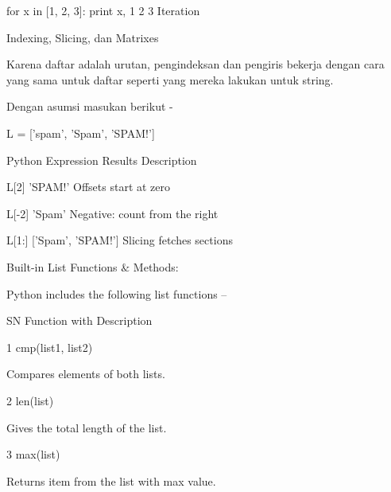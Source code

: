 for x in [1, 2, 3]: print x, \hspace*{0.5in} 1 2 3 \hspace*{0.5in} Iteration \par
\vspace{12pt}
Indexing, Slicing, dan Matrixes \par
Karena daftar adalah urutan, pengindeksan dan pengiris bekerja dengan cara yang sama untuk daftar seperti yang mereka lakukan untuk string. \par
Dengan asumsi masukan berikut - \par
L = ['spam', 'Spam', 'SPAM!'] \par
  \par
Python Expression \hspace*{0.5in} Results  \hspace*{0.5in} Description \par
L[2] \hspace*{0.5in} 'SPAM!' \hspace*{0.5in} Offsets start at zero \par
L[-2] \hspace*{0.5in} 'Spam' \hspace*{0.5in} Negative: count from the right \par
L[1:] \hspace*{0.5in} ['Spam', 'SPAM!'] \hspace*{0.5in} Slicing fetches sections \par
Built-in List Functions  $  \&  $ Methods: \par
Python includes the following list functions – \par
\vspace{12pt}
SN \hspace*{0.5in} Function with Description \par
1 \hspace*{0.5in} cmp(list1, list2) \par
\vspace{12pt}
Compares elements of both lists. \par
2 \hspace*{0.5in} len(list) \par
\vspace{12pt}
Gives the total length of the list. \par
3 \hspace*{0.5in} max(list) \par
\vspace{12pt}
Returns item from the list with max value. \par
